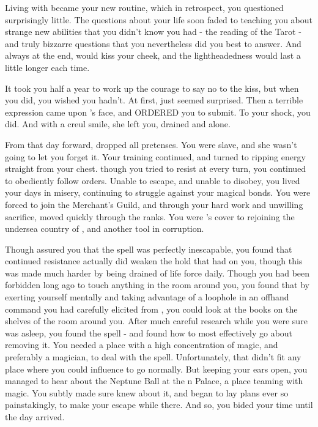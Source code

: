 \documentclass[char]{NeptuneBall}
\begin{document}
Living with \cWitch{\them} became your new routine, which in retrospect, you questioned surprisingly little. The questions about your life soon faded to \cWitch{\them} teaching you about strange new abilities that you didn't know you had - the reading of the Tarot - and truly bizzarre questions that you nevertheless did you best to answer. And always at the end, \cWitch{\they} would kiss your cheek, and the lightheadedness would last a little longer each time.

It took you half a year to work up the courage to say no to the kiss, but when you did, you wished you hadn't. At first, \cWitch{\they} just seemed surprised. Then a terrible expression came upon \cWitch{}'s face, and \cWitch{\they} ORDERED you to submit. To your shock, you did. And with a creul smile, she left you, drained and alone.

From that day forward, \cWitch{} dropped all pretenses. You were \cWitch{\their} slave, and she wasn't going to let you forget it. Your training continued, and \cWitch{\their} turned to ripping energy straight from your chest. though you tried to resist \cWitch{\them} at every turn, you continued to obediently follow orders. Unable to escape, and unable to disobey, you lived your days in misery, continuing to struggle against your magical bonds. You were forced to join the Merchant's Guild, and through your hard work and unwilling sacrifice, moved quickly through the ranks. You were \cWitch{}'s cover to rejoining the undersea country of \pAtlantis{}, and another tool in \cWitch{\their} corruption.

Though \cWitch{\they} assured you that the spell was perfectly inescapable, you found that continued resistance actually did weaken the hold that \cWitch{\they} had on you, though this was made much harder by being drained of life force daily. Though you had been forbidden long ago to touch anything in the room around you, you found that by exerting yourself mentally and taking advantage of a loophole in an offhand command you had carefully elicited from \cWitch{\them}, you could look at the books on the shelves of the room around you. After much careful research while you were sure \cWitch{} was asleep, you found the spell - and found how to most effectively go about removing it. You needed a place with a high concentration of magic, and preferably a magician, to deal with the spell. Unfortunately, that didn't fit any place where you could influence \cWitch{} to go normally. But keeping your ears open, you managed to hear about the Neptune Ball at the \pAtlantis{}n Palace, a place teaming with magic. You subtly made sure \cWitch{} knew about it, and began to lay plans ever so painstakingly, to make your escape while there. And so, you bided your time until the day arrived.
\end{document}
